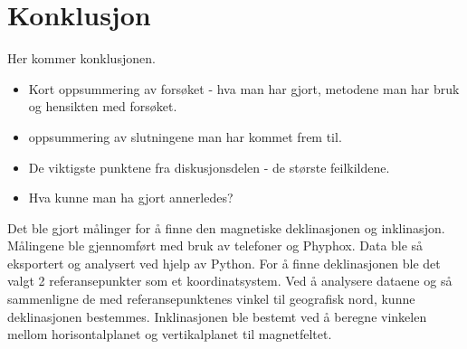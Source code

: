 \section{Konklusjon}
Her kommer konklusjonen.

\begin{itemize}
    \item Kort oppsummering av forsøket - hva man har gjort, metodene man har bruk og hensikten med forsøket. 
    \item oppsummering av slutningene man har kommet frem til.
    \item De viktigste punktene fra diskusjonsdelen - de største feilkildene. 
    \item Hva kunne man ha gjort annerledes?
\end{itemize}

Det ble gjort målinger for å finne den magnetiske deklinasjonen og inklinasjon. Målingene ble gjennomført med bruk av telefoner og Phyphox. Data ble så eksportert og analysert ved hjelp av Python. For å finne deklinasjonen ble det valgt 2 referansepunkter som et koordinatsystem. Ved å analysere dataene og så sammenligne de med referansepunktenes vinkel til geografisk nord, kunne deklinasjonen bestemmes. Inklinasjonen ble bestemt ved å beregne vinkelen mellom horisontalplanet og vertikalplanet til magnetfeltet. 

